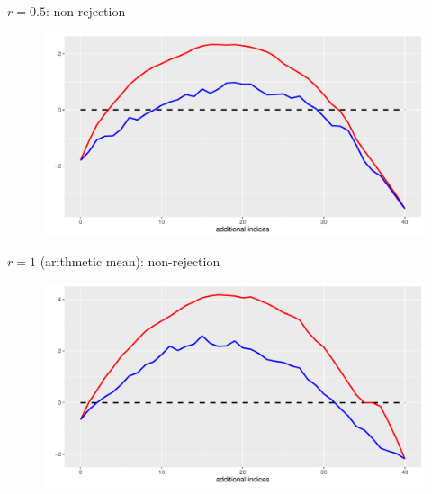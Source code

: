 \documentclass[aspectratio=169]{beamer}
\begin{document}
\begin{frame}{$r=0.5$: non-rejection}
\begin{figure}
\centering
\includegraphics[scale=0.6]{plot05.pdf}
\end{figure}
\end{frame}



\begin{frame}{$r=1$ (arithmetic mean): non-rejection}
\begin{figure}
\centering
\includegraphics[scale=0.6]{plot1.pdf}
\end{figure}
\end{frame}

\end{document}
